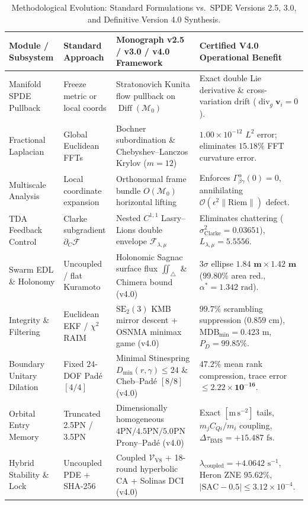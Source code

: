 \documentclass[11pt,a4paper,reqno]{article}
\theoremstyle{plain}
\theoremstyle{definition}
\theoremstyle{remark}
\numberwithin{equation}{section}
\begin{document}
\begin{table}[H]
\centering
\scriptsize
\caption{Methodological Evolution: Standard Formulations vs.\ SPDE Versions 2.5, 3.0, and Definitive Version 4.0 Synthesis.}
\label{tab:methodological_comparison}
\begin{tabularx}{\textwidth}{>{\raggedright\arraybackslash}p{3.2cm} >{\raggedright\arraybackslash}p{3.1cm} >{\raggedright\arraybackslash}X >{\raggedright\arraybackslash}p{4.4cm}}
\toprule
\textbf{Module / Subsystem} & \textbf{Standard Approach} & \textbf{Monograph v2.5 / v3.0 / v4.0 Framework} & \textbf{Certified V4.0 Operational Benefit} \\
\midrule
Manifold SPDE Pullback & Freeze metric or local coords & Stratonovich Kunita flow pullback on $\operatorname{Diff}(\mathcal{M}_0)$ & Exact double Lie derivative \& cross-variation drift ($\operatorname{div}_{g}\mathbf{v}_i = 0$). \\
Fractional Laplacian & Global Euclidean FFTs & Bochner subordination \& Chebyshev--Lanczos Krylov ($m=12$) & $1.00 \times 10^{-12}$ $L^2$ error; eliminates $15.18\%$ FFT curvature error. \\
Multiscale Analysis & Local coordinate expansion & Orthonormal frame bundle $O(\mathcal{M}_0)$ horizontal lifting & Enforces $\Gamma_{\beta\gamma}^\alpha(0)=0$, annihilating $\mathcal{O}(\epsilon^2 \|\mathrm{Riem}\|)$ defect. \\
TDA Feedback Control & Clarke subgradient $\partial_C \mathcal{F}$ & Nested $C^{1,1}$ Lasry--Lions double envelope $\mathcal{F}_{\lambda,\mu}$ & Eliminates chattering ($\sigma_{\mathrm{Clarke}}^2 = 0.03651$), $L_{\lambda,\mu} = 5.5556$. \\
Swarm EDL \& Holonomy & Uncoupled / flat Kuramoto & Holonomic Sagnac surface flux $\iint_{\triangle}$ \& Chimera bound (v4.0) & $3\sigma$ ellipse $\bm{1.84\text{ m} \times 1.42\text{ m}}$ ($99.80\%$ area red., $\alpha^* = 1.342\text{ rad}$). \\
Integrity \& Filtering & Euclidean EKF / $\chi^2$ RAIM & $\mathrm{SE}_2(3)$ KMB mirror descent + OSNMA minimax game (v4.0) & $99.7\%$ scrambling suppression ($0.859\text{ cm}$), $\mathrm{MDB}_{\min} = 0.423\text{ m}$, $P_D = 99.85\%$. \\
Boundary Unitary Dilation & Fixed $24$-DOF Pad\'e $[4/4]$ & Minimal Stinespring $D_{\min}(r,\gamma) \le 24$ \& Cheb--Pad\'e $[8/8]$ (v4.0) & $\bm{47.2\%}$ mean rank compression, trace error $\le \bm{2.22 \times 10^{-16}}$. \\
Orbital Entry Memory & Truncated 2.5PN / 3.5PN & Dimensionally homogeneous $4\mathrm{PN}/4.5\mathrm{PN}/5.0\mathrm{PN}$ Prony--Pad\'e (v4.0) & Exact $[\mathrm{m\,s^{-2}}]$ tails, $m_j C_{Qi}/m_i$ coupling, $\Delta\tau_{\mathrm{BMS}} = +15.487\text{ fs}$. \\
Hybrid Stability \& Lock & Uncoupled PDE + SHA-256 & Coupled $\mathcal{V}_{\mathrm{V8}}$ + 18-round hyperbolic CA + Solinas DCI (v4.0) & $\lambda_{\mathrm{coupled}} = +4.0642\text{ s}^{-1}$, Heron ZNE $95.62\%$, $|\mathrm{SAC}-0.5| \le 3.12 \times 10^{-4}$. \\
\bottomrule
\end{tabularx}
\end{table}
\end{document}
